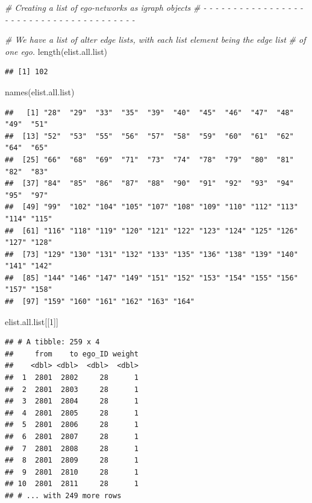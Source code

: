 \documentclass[
]{book}
\newenvironment{Shaded}{\begin{snugshade}}{\end{snugshade}}
\newcommand{\CommentTok}[1]{\textcolor[rgb]{0.56,0.35,0.01}{\textit{#1}}}
\newcommand{\DecValTok}[1]{\textcolor[rgb]{0.00,0.00,0.81}{#1}}
\newcommand{\FunctionTok}[1]{\textcolor[rgb]{0.00,0.00,0.00}{#1}}
\newcommand{\NormalTok}[1]{#1}
\begin{document}
\begin{Shaded}
\begin{Highlighting}[]
\CommentTok{\# Creating a list of ego{-}networks as igraph objects}
\CommentTok{\# {-} {-} {-} {-} {-} {-} {-} {-} {-} {-} {-} {-} {-} {-} {-} {-} {-} {-} {-} {-} {-} {-} {-} {-} {-} {-} {-} {-} {-} {-} {-} {-} {-} {-} {-} {-} {-} {-} {-}}

\CommentTok{\# We have a list of alter edge lists, with each list element being the edge list }
\CommentTok{\# of one ego.}
\FunctionTok{length}\NormalTok{(elist.all.list)}
\end{Highlighting}
\end{Shaded}

\begin{verbatim}
## [1] 102
\end{verbatim}

\begin{Shaded}
\begin{Highlighting}[]
\FunctionTok{names}\NormalTok{(elist.all.list)}
\end{Highlighting}
\end{Shaded}

\begin{verbatim}
##   [1] "28"  "29"  "33"  "35"  "39"  "40"  "45"  "46"  "47"  "48"  "49"  "51" 
##  [13] "52"  "53"  "55"  "56"  "57"  "58"  "59"  "60"  "61"  "62"  "64"  "65" 
##  [25] "66"  "68"  "69"  "71"  "73"  "74"  "78"  "79"  "80"  "81"  "82"  "83" 
##  [37] "84"  "85"  "86"  "87"  "88"  "90"  "91"  "92"  "93"  "94"  "95"  "97" 
##  [49] "99"  "102" "104" "105" "107" "108" "109" "110" "112" "113" "114" "115"
##  [61] "116" "118" "119" "120" "121" "122" "123" "124" "125" "126" "127" "128"
##  [73] "129" "130" "131" "132" "133" "135" "136" "138" "139" "140" "141" "142"
##  [85] "144" "146" "147" "149" "151" "152" "153" "154" "155" "156" "157" "158"
##  [97] "159" "160" "161" "162" "163" "164"
\end{verbatim}

\begin{Shaded}
\begin{Highlighting}[]
\NormalTok{elist.all.list[[}\DecValTok{1}\NormalTok{]]}
\end{Highlighting}
\end{Shaded}

\begin{verbatim}
## # A tibble: 259 x 4
##     from    to ego_ID weight
##    <dbl> <dbl>  <dbl>  <dbl>
##  1  2801  2802     28      1
##  2  2801  2803     28      1
##  3  2801  2804     28      1
##  4  2801  2805     28      1
##  5  2801  2806     28      1
##  6  2801  2807     28      1
##  7  2801  2808     28      1
##  8  2801  2809     28      1
##  9  2801  2810     28      1
## 10  2801  2811     28      1
## # ... with 249 more rows
\end{verbatim}
\end{document}
